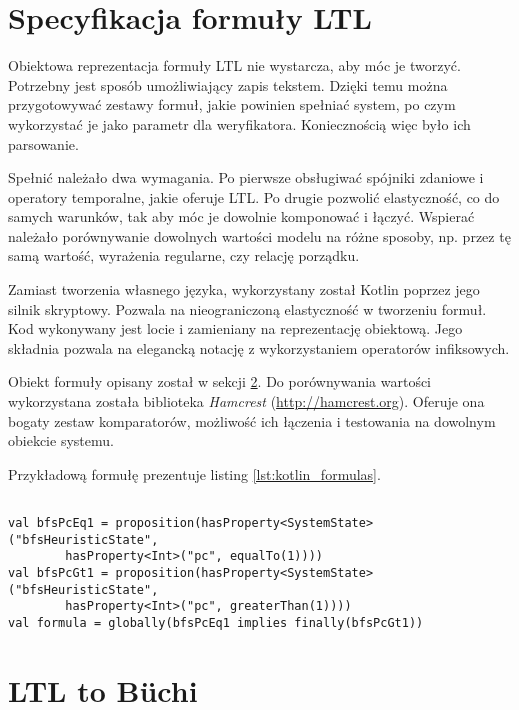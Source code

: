 \section{Specyfikacja formuły LTL} \label{sec:LTL_formula_spec}

Obiektowa reprezentacja formuły LTL nie wystarcza, aby móc je tworzyć.
Potrzebny jest sposób umożliwiający zapis tekstem.
Dzięki temu można przygotowywać zestawy formuł, jakie powinien spełniać system, po czym wykorzystać je jako parametr dla weryfikatora.
Koniecznością więc było ich parsowanie.

Spełnić należało dwa wymagania.
Po pierwsze obsługiwać spójniki zdaniowe i operatory temporalne, jakie oferuje LTL.
Po drugie pozwolić elastyczność, co do samych warunków, tak aby móc je dowolnie komponować i łączyć.
Wspierać należało porównywanie dowolnych wartości modelu na różne sposoby, np. przez tę samą wartość, wyrażenia regularne, czy relację porządku.

Zamiast tworzenia własnego języka, wykorzystany został Kotlin poprzez jego silnik skryptowy.
Pozwala na nieograniczoną elastyczność w tworzeniu formuł.
Kod wykonywany jest locie i zamieniany na reprezentację obiektową.
Jego składnia pozwala na elegancką notację z wykorzystaniem operatorów infiksowych.

Obiekt formuły opisany został w sekcji \ref{sec:ltl2buchi}.
Do porównywania wartości wykorzystana została biblioteka \textit{Hamcrest} (\url{http://hamcrest.org}).
Oferuje ona bogaty zestaw komparatorów, możliwość ich łączenia i testowania na dowolnym obiekcie systemu.

Przykładową formułę prezentuje listing \ref{lst:kotlin_formulas}.

\begin{minipage}{\linewidth}
\begin{lstlisting}[caption={Przykładowa formuły LTL w języku Kotlin.},captionpos=b,label={lst:kotlin_formulas}]

val bfsPcEq1 = proposition(hasProperty<SystemState>("bfsHeuristicState", 
        hasProperty<Int>("pc", equalTo(1))))
val bfsPcGt1 = proposition(hasProperty<SystemState>("bfsHeuristicState",
        hasProperty<Int>("pc", greaterThan(1))))
val formula = globally(bfsPcEq1 implies finally(bfsPcGt1))

\end{lstlisting}
\end{minipage}


\section{LTL to Büchi} \label{sec:ltl2buchi}

